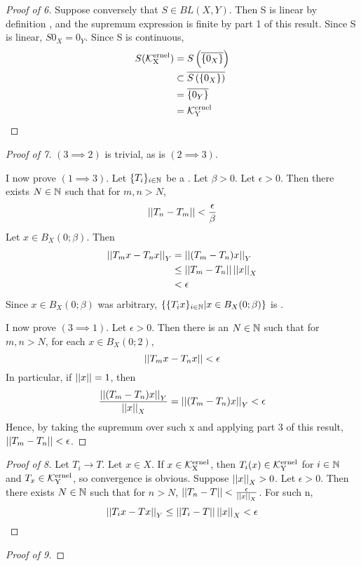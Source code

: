 \begin{prop}
\begin{proof}[Proof of 6]
    Suppose conversely that $S \in BL(X,Y)$. 
    Then S is linear by definition
    , and the supremum expression is finite by part 1 
    of this result. 
    Since S is linear, $S0_X = 0_Y$. 
    Since S is continuous, 
    \begin{align*}
        S(\bf\mathcal{K}\rm^{ernel}_X) &= S\left( \overline{\{0_X\}}\right)\\
        & \subset \overline{S\left( \{0_X\}\right)}\\
        & =\overline{\{0_Y\}} \\
        & = \bf\mathcal{K}\rm^{ernel}_Y
    \end{align*}



\end{proof}
\begin{proof}[Proof of 7]
    $(3 \implies 2)$ is trivial, as is $(2 \implies 3)$.
    
    I now prove $(1\implies 3)$. 
    Let $\{T_i\}_{i \in \mathbb{N}}$ be a 
    \PseudometricCauchySequence.
    Let $\beta > 0$. 
    Let $\epsilon > 0$. 
    Then there exists $N \in \mathbb{N}$
    such that for $m,n > N$, 
    \begin{equation*}
    \left|\left| T_n-T_m \right|\right| < \frac{\epsilon}{\beta}
    \end{equation*}
    Let $x \in B_X(0;\beta)$. 
    Then 
    \begin{align*}
        \left|\left| T_mx-T_nx \right|\right|_Y & = \left|\left| (T_m-T_n)x \right|\right|_Y\\
        & \leq \left|\left| T_m-T_n \right|\right| \left|\left| x \right|\right|_X\\
        & < \epsilon
    \end{align*}
    Since $x \in B_X(0;\beta)$ was arbitrary,
    $\{\{T_ix\}_{i \in \mathbb{N}} | x \in B_X(0;\beta)\}$ is
    \UniformlyCauchy.

    I now prove $(3 \implies 1)$. 
    Let $\epsilon > 0$.
    Then there is an $N \in \mathbb{N}$ 
    such that for $m,n>N$, 
    for each $x \in B_X(0;2)$, 
    \begin{equation*}
    \left|\left| T_mx-T_nx \right|\right| < \epsilon
    \end{equation*}
    In particular, if $\left|\left| x \right|\right|=1$, then 
    \begin{equation}
    \frac{\left|\left| (T_m-T_n)x \right|\right|_Y}{\left|\left| x \right|\right|_X} =\left|\left| (T_m-T_n)x \right|\right|_Y < \epsilon
    \end{equation}
    Hence, by taking the supremum over such x
    and applying part 3 of this result, 
    $\left|\left| T_m-T_n \right|\right| < \epsilon$. 
\end{proof}
\begin{proof}[Proof of 8]
    Let $T_i \to T$. 
    Let $x \in X$. 
    If $x \in \bf\mathcal{K}\rm^{ernel}_X$, then $T_i(x) \in \bf\mathcal{K}\rm^{ernel}_Y$ for $i \in \mathbb{N}$ and $T_x \in \bf\mathcal{K}\rm^{ernel}_Y$, 
    so convergence is obvious. 
    Suppose $\left|\left| x \right|\right|_X > 0$. 
    Let $\epsilon > 0$. 
    Then there exists $N \in \mathbb{N}$ such that
    for $n>N$, $\left|\left| T_n-T \right|\right| < \frac{\epsilon}{\left|\left| x \right|\right|_X}$.
    For such n, 
    \begin{equation*}
    \left|\left| T_ix-Tx \right|\right|_Y \leq \left|\left| T_i-T \right|\right| \left|\left| x \right|\right|_X < \epsilon
    \end{equation*}
\end{proof}
\begin{proof}[Proof of 9]
    

\end{proof}
\end{prop}

